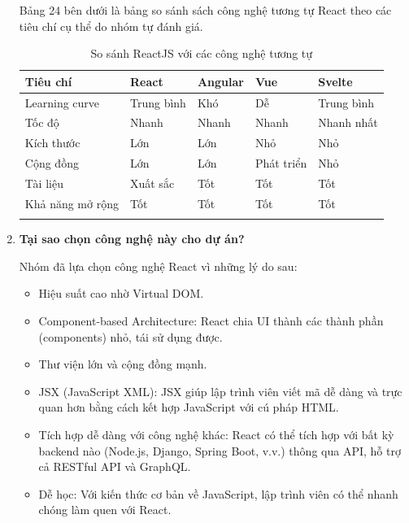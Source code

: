 \begin{enumerate}
	Bảng 24 bên dưới là bảng so sánh sách công nghệ tương tự React theo các tiêu chí cụ thể do nhóm tự đánh giá.
	\begin{longtable}{|>{\raggedright\arraybackslash}m{4cm}|>{\centering\arraybackslash}m{2.5cm}|>{\centering\arraybackslash}m{2.5cm}|>{\centering\arraybackslash}m{2.5cm}|>{\centering\arraybackslash}m{2.5cm}|}
		\hline
		\textbf{Tiêu chí} & \textbf{React} & \textbf{Angular} & \textbf{Vue} & \textbf{Svelte} \\ 
		\hline
		Learning curve & Trung bình & Khó & Dễ & Trung bình \\ 
		\hline
		Tốc độ & Nhanh & Nhanh & Nhanh & Nhanh nhất \\ 
		\hline
		Kích thước & Lớn & Lớn & Nhỏ  & Nhỏ \\ 
		\hline
		Cộng đồng & Lớn & Lớn & Phát triển & Nhỏ \\ 
		\hline
		Tài liệu & Xuất sắc & Tốt & Tốt & Tốt \\ 
		\hline
		Khả năng mở rộng & Tốt & Tốt & Tốt & Tốt \\ 
		\hline
		\caption{So sánh ReactJS với các công nghệ tương tự}
	\end{longtable}
	
	\item \textbf{Tại sao chọn công nghệ này cho dự án?}
	
	Nhóm đã lựa chọn công nghệ React vì những lý do sau:
	\begin{itemize}
	\item Hiệu suất cao nhờ Virtual DOM.
    \item Component-based Architecture: React chia UI thành các thành phần (components) nhỏ, tái sử dụng được.
    \item Thư viện lớn và cộng đồng mạnh.
    \item JSX (JavaScript XML): JSX giúp lập trình viên viết mã dễ dàng và trực quan hơn bằng cách kết hợp JavaScript với cú pháp HTML.
    \item Tích hợp dễ dàng với công nghệ khác: React có thể tích hợp với bất kỳ backend nào (Node.js, Django, Spring Boot, v.v.) thông qua API, hỗ trợ cả RESTful API và GraphQL.
    \item Dễ học: Với kiến thức cơ bản về JavaScript, lập trình viên có thể nhanh chóng làm quen với React.
	\end{itemize}
	
\end{enumerate}

